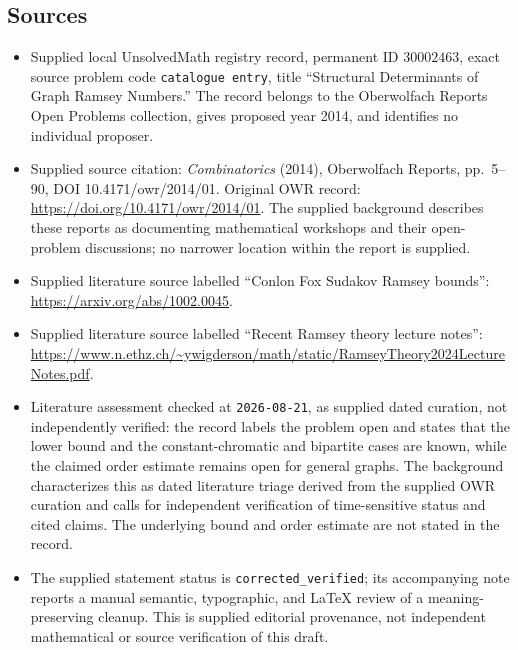 \documentclass[11pt]{article}
\begin{document}
\subsection{Sources}
\begin{itemize}
\item Supplied local UnsolvedMath registry record, permanent ID \(30002463\), exact source problem code \texttt{catalogue entry}, title ``Structural Determinants of Graph Ramsey Numbers.'' The record belongs to the Oberwolfach Reports Open Problems collection, gives proposed year 2014, and identifies no individual proposer.
\item Supplied source citation: \emph{Combinatorics} (2014), Oberwolfach Reports, pp.\ 5--90, DOI 10.4171/owr/2014/01. Original OWR record: \url{https://doi.org/10.4171/owr/2014/01}. The supplied background describes these reports as documenting mathematical workshops and their open-problem discussions; no narrower location within the report is supplied.
\item Supplied literature source labelled ``Conlon Fox Sudakov Ramsey bounds'': \url{https://arxiv.org/abs/1002.0045}.
\item Supplied literature source labelled ``Recent Ramsey theory lecture notes'': \url{https://www.n.ethz.ch/~ywigderson/math/static/RamseyTheory2024LectureNotes.pdf}.
\item Literature assessment checked at \texttt{2026-08-21}, as supplied dated curation, not independently verified: the record labels the problem open and states that the lower bound and the constant-chromatic and bipartite cases are known, while the claimed order estimate remains open for general graphs. The background characterizes this as dated literature triage derived from the supplied OWR curation and calls for independent verification of time-sensitive status and cited claims. The underlying bound and order estimate are not stated in the record.
\item The supplied statement status is \texttt{corrected\_verified}; its accompanying note reports a manual semantic, typographic, and LaTeX review of a meaning-preserving cleanup. This is supplied editorial provenance, not independent mathematical or source verification of this draft.
\end{itemize}
\end{document}

